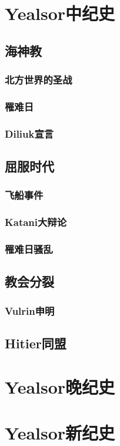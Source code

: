 \documentclass[UTF8,12pt]{ctexbook}
\begin{document}
    \chapter{Yealsor中纪史}
        \section{海神教}
            \subsection{北方世界的圣战}

            \subsection{罹难日}

            \subsection{Diliuk宣言}
        \section{屈服时代}
            \subsection{飞船事件}

            \subsection{Katani大辩论}

            \subsection{罹难日骚乱}
        \section{教会分裂}
            \subsection{Vulrin申明}
        \section{Hitier同盟}

    \chapter{Yealsor晚纪史}

    \chapter{Yealsor新纪史}
    
\end{document}
